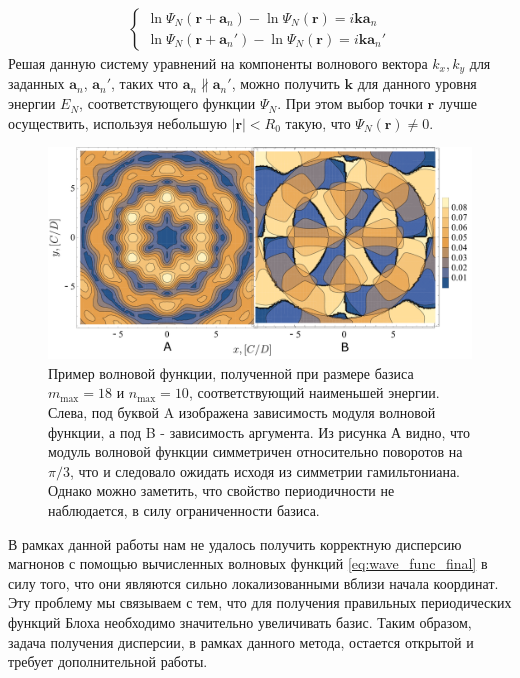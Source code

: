 \documentclass[a4paper,article,14pt]{extarticle}
\begin{document}
\begin{equation}
\begin{aligned}
\begin{cases}
	\ln{ \Psi_N(\mathbf{r} + \mathbf{a}_n) } -  \ln{\Psi_N(\mathbf{r})} = i \mathbf{k} \mathbf{a}_n \\
	\ln{ \Psi_N(\mathbf{r} + \mathbf{a}_n') } -  \ln{\Psi_N(\mathbf{r})}  = i \mathbf{k} \mathbf{a}_n'
\end{cases}
\end{aligned}
\end{equation}
Решая данную систему уравнений на компоненты волнового вектора $k_x,k_y$ для заданных $\mathbf{a}_n$, $\mathbf{a}_n'$, таких что $\mathbf{a}_n \nparallel \mathbf{a}_n'$, можно получить $\mathbf{k}$ для данного уровня энергии $E_N$, соответствующего функции $\Psi_N$. При этом выбор точки $\mathbf{r}$ лучше осуществить, используя небольшую $|\mathbf{r}|<R_0$ такую, что $\Psi_N(\mathbf{r}) \neq 0$.


\begin{figure}[t]
\centering	
\includegraphics[width=1.03\columnwidth]{images/eigenfunc.pdf}
\caption{Пример волновой функции, полученной при размере базиса $m_\text{max}=18$ и $n_\text{max}=10$, соответствующий наименьшей энергии. Слева, под буквой A изображена зависимость модуля волновой функции, а под B - зависимость аргумента. Из рисунка А видно, что модуль волновой функции симметричен относительно поворотов на $\pi/3$, что и следовало ожидать исходя из симметрии гамильтониана. Однако можно заметить, что свойство периодичности не наблюдается, в силу ограниченности базиса.}
\label{fig:landau_eigenfunction}
\end{figure}


В рамках данной работы нам не удалось получить корректную дисперсию магнонов с помощью вычисленных волновых функций \eqref{eq:wave_func_final} в силу того, что они являются сильно локализованными вблизи начала координат. Эту проблему мы связываем с тем, что для получения правильных периодических функций Блоха необходимо значительно увеличивать базис. Таким образом, задача получения дисперсии, в рамках данного метода, остается открытой и требует дополнительной работы.
\end{document}
